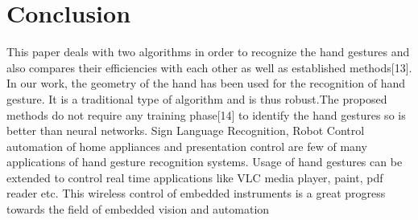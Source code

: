 \documentclass[conference]{IEEEtran}
\begin{document}
\section{Conclusion}
This paper deals with two algorithms in order to recognize the hand gestures and also compares their efficiencies with each other as well as established methods[13]. In our work, the geometry of the hand has been used for the recognition of hand gesture. It is a traditional type of algorithm and is thus robust.The proposed methods do not require any training phase[14] to identify the hand gestures so is better than neural networks. Sign Language Recognition, Robot Control automation of home appliances and presentation control are few of many applications of hand gesture recognition systems. Usage of hand gestures can be extended to control real time applications like VLC media player, paint, pdf reader etc. This wireless control of embedded instruments is a great progress towards the field of embedded vision and automation

\end{document}
